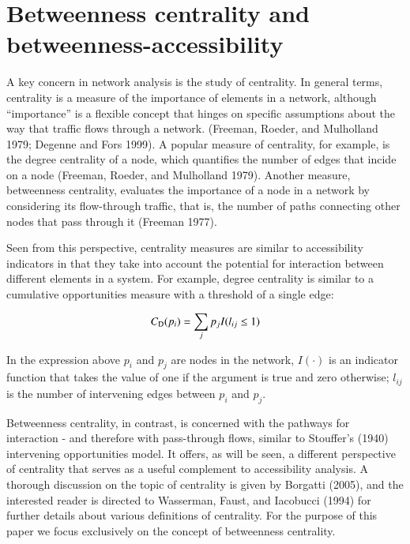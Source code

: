 \documentclass[]{elsarticle} %
\begin{document}
\section{Betweenness centrality and
betweenness-accessibility}\label{betweenness-centrality-and-betweenness-accessibility}

A key concern in network analysis is the study of centrality. In general
terms, centrality is a measure of the importance of elements in a
network, although ``importance'' is a flexible concept that hinges on
specific assumptions about the way that traffic flows through a network.
(Freeman, Roeder, and Mulholland 1979; Degenne and Fors 1999). A popular
measure of centrality, for example, is the degree centrality of a node,
which quantifies the number of edges that incide on a node (Freeman,
Roeder, and Mulholland 1979). Another measure, betweenness centrality,
evaluates the importance of a node in a network by considering its
flow-through traffic, that is, the number of paths connecting other
nodes that pass through it (Freeman 1977).

Seen from this perspective, centrality measures are similar to
accessibility indicators in that they take into account the potential
for interaction between different elements in a system. For example,
degree centrality is similar to a cumulative opportunities measure with
a threshold of a single edge:

\begin{equation}\label{f:degree}
C_{\rm D}(p_i) = \sum_j p_jI(l_{ij}\le 1)
\end{equation}

In the expression above \(p_i\) and \(p_j\) are nodes in the network,
\(I(\cdot)\) is an indicator function that takes the value of one if the
argument is true and zero otherwise; \(l_{ij}\) is the number of
intervening edges between \(p_i\) and \(p_j\).

Betweenness centrality, in contrast, is concerned with the pathways for
interaction - and therefore with pass-through flows, similar to
Stouffer's (1940) intervening opportunities model. It offers, as will be
seen, a different perspective of centrality that serves as a useful
complement to accessibility analysis. A thorough discussion on the topic
of centrality is given by Borgatti (2005), and the interested reader is
directed to Wasserman, Faust, and Iacobucci (1994) for further details
about various definitions of centrality. For the purpose of this paper
we focus exclusively on the concept of betweenness centrality.
\end{document}
